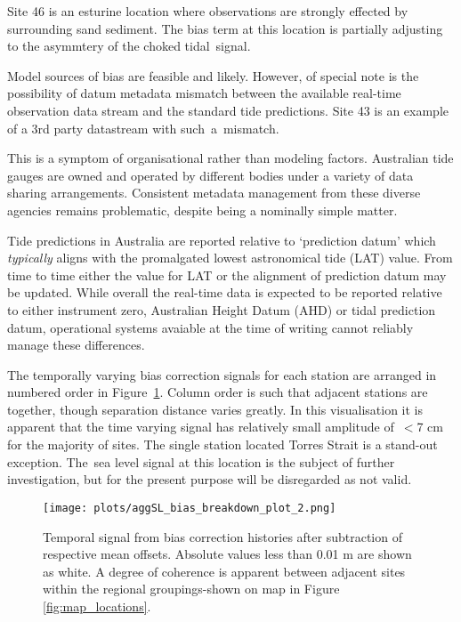 Site 46 is an esturine location where observations are strongly effected by surrounding sand sediment. The bias term at this location is partially adjusting to the asymmtery of the choked tidal~signal. 


Model sources of bias are feasible and likely.
However, of special note is the possibility of datum metadata mismatch between the available real-time observation data stream and the standard tide predictions. 
Site 43 is an example of a 3rd party datastream with such~a~mismatch. 

This is a symptom of organisational rather than modeling factors.   
Australian tide gauges are owned and operated by different bodies under a variety of data sharing arrangements.
Consistent metadata management from these diverse agencies remains problematic, despite being a nominally simple matter.

Tide predictions in Australia are reported relative to `prediction datum' which \textit{typically} aligns with the promalgated lowest astronomical tide (LAT) value.   
From time to time either the value for LAT or the alignment of prediction datum may be updated.  
While overall the real-time data is expected to be reported relative to either instrument zero, Australian Height Datum (AHD) or tidal prediction datum, operational systems avaiable at the time of writing cannot reliably manage these differences.


The temporally varying bias correction signals for each station are arranged in numbered order in Figure~\ref{fig:bias_time}.
Column order is such that adjacent stations are together, though separation distance varies greatly. 
In this visualisation it is apparent that the time varying signal has relatively small amplitude of~$<$7 cm for the majority of sites.
The single station located Torres Strait is a stand-out exception.  The~sea level signal at this location is the subject of further investigation, but for the present purpose will be disregarded as not valid.  


\begin{figure}[H]
\centering
\texttt{[image: plots/aggSL\_bias\_breakdown\_plot\_2.png]}
\caption{Temporal signal from bias correction histories after subtraction of respective mean offsets.  Absolute values less than 0.01 m are shown as white.  A degree of coherence is apparent between adjacent sites within the regional groupings-shown on map in Figure \ref{fig:map_locations}. } 
\label{fig:bias_time}
\end{figure}  


